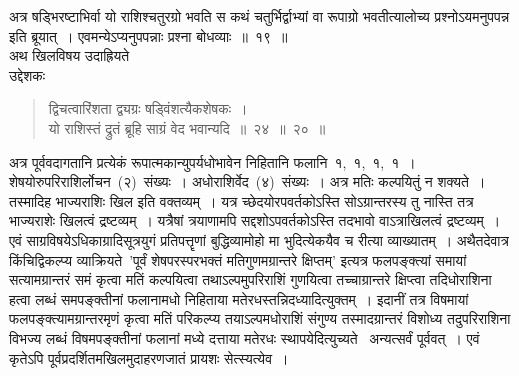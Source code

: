 \documentclass[11pt, openany]{book}
\begin{document}
\indent
अत्र षड्भिरष्टाभिर्वा यो राशिश्चतुरग्रो भवति स कथं चतुर्भिर्द्वाभ्यां वा रूपाग्रो भवतीत्यालोच्य प्रश्नोऽयमनुपपन्न इति ब्रूयात्~। एवमन्येऽप्यनुपपन्नाः प्रश्ना बोधव्याः~॥~१९~॥\\
\indent
अथ खिलविषय उदाह्रियते \textendash\\
उद्देशकः\textendash
\begin{quote}
{\ku द्विचत्वारिंशता द्व्यग्रः षड्विंशत्यैकशेषकः~।\\
यो राशिस्तं द्रुतं ब्रूहि साग्रं वेद भवान्यदि~॥~२४~॥~२०~॥}
\end{quote}

\indent
अत्र पूर्ववदागतानि प्रत्येकं रूपात्मकान्युपर्यधोभावेन निहितानि फलानि~१,~१,~१,~१~। शेषयोरुपरिराशिर्लोचन~(२)~संख्यः~। अधोराशिर्वेद~(४)~संख्यः~। अत्र मतिः कल्पयितुं न शक्यते~। तस्मादिह भाज्यराशिः खिल इति वक्तव्यम्~। यत्र च्छेदयोरपवर्तकोऽस्ति सोऽग्रान्तरस्य तु नास्ति तत्र भाज्यराशेः खिलत्वं द्रष्टव्यम्~। यत्रैषां त्रयाणामपि सद्दशोऽपवर्तकोऽस्ति तदभावो वाऽत्राखिलत्वं द्रष्टव्यम्~। एवं साग्रविषयेऽधिकाग्रादिसूत्रयुगं प्रतिपत्तॄणां बुद्धिव्यामोहो मा भुदित्येकयैव च रीत्या व्याख्यातम्~। अथैतदेवात्र किंचिद्विकल्प्य व्याक्रियते\textendash\ 'पूर्वं शेषपरस्परभक्तं मतिगुणमग्रान्तरे क्षिप्तम्' इत्यत्र फलपङ्क्त्यां समायां सत्यामग्रान्तरं समं कृत्वा मतिं कल्पयित्वा तथाऽल्पमुपरिराशिं गुणयित्वा तच्चाग्रान्तरे क्षिप्त्वा तदिधोराशिना हत्वा लब्धं समपङ्क्तीनां फलानामधो निहिताया मतेरधस्तन्निदध्यादित्युक्तम्~। इदानीं तत्र विषमायां फलपङ्क्त्यामग्रान्तरमृणं कृत्वा मतिं परिकल्प्य तयाऽल्पमधोराशिं संगुण्य तस्मादग्रान्तरं विशोध्य तदुपरिराशिना विभज्य लब्धं विषमपङ्क्तीनां फलानां मध्ये दत्ताया मतेरधः स्थापयेदित्युच्यते \textendash\ अन्यत्सर्वं पूर्ववत्~। एवं कृतेऽपि पूर्वप्रदर्शितमखिलमुदाहरणजातं प्रायशः सेत्स्यत्येव~।
\end{document}
